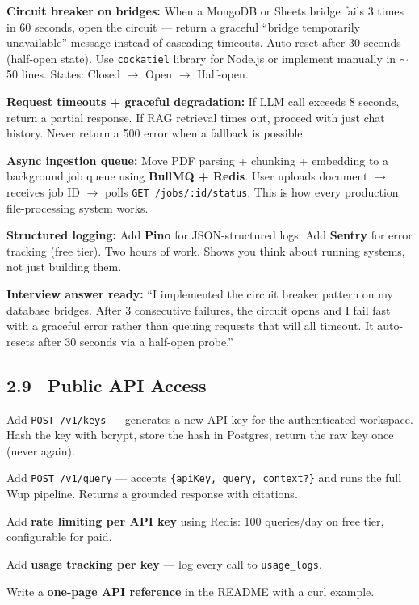 \documentclass[11pt, a4paper]{article}
\DeclareRobustCommand{\badge}[2]{%
  \tikz[baseline=(n.base)]{
    \node[inner sep=3pt, rounded corners=3pt,
          fill=#1!15, text=#1!70!black,
          font=\fontsize{8}{8}\selectfont\bfseries] (n) {#2};
  }%
}
\DeclareRobustCommand{\high}{\badge{warning}{HIGH}}
\begin{document}
\begin{checklist}
  \item \textbf{Circuit breaker on bridges:} When a MongoDB or Sheets bridge fails 3 times in 60 seconds, open the circuit — return a graceful ``bridge temporarily unavailable'' message instead of cascading timeouts. Auto-reset after 30 seconds (half-open state). Use \texttt{cockatiel} library for Node.js or implement manually in $\sim$50 lines. States: Closed $\rightarrow$ Open $\rightarrow$ Half-open.

  \item \textbf{Request timeouts + graceful degradation:} If LLM call exceeds 8 seconds, return a partial response. If RAG retrieval times out, proceed with just chat history. Never return a 500 error when a fallback is possible.

  \item \textbf{Async ingestion queue:} Move PDF parsing + chunking + embedding to a background job queue using \textbf{BullMQ + Redis}. User uploads document $\rightarrow$ receives job ID $\rightarrow$ polls \texttt{GET /jobs/:id/status}. This is how every production file-processing system works.

  \item \textbf{Structured logging:} Add \textbf{Pino} for JSON-structured logs. Add \textbf{Sentry} for error tracking (free tier). Two hours of work. Shows you think about running systems, not just building them.
\end{checklist}

\begin{successbox}
\textbf{Interview answer ready:} ``I implemented the circuit breaker pattern on my database bridges. After 3 consecutive failures, the circuit opens and I fail fast with a graceful error rather than queuing requests that will all timeout. It auto-resets after 30 seconds via a half-open probe.''
\end{successbox}

\subsection{2.9 \ Public API Access \hfill \high}

\begin{checklist}
  \item Add \texttt{POST /v1/keys} — generates a new API key for the authenticated workspace. Hash the key with bcrypt, store the hash in Postgres, return the raw key once (never again).
  \item Add \texttt{POST /v1/query} — accepts \texttt{\{apiKey, query, context?\}} and runs the full Wup pipeline. Returns a grounded response with citations.
  \item Add \textbf{rate limiting per API key} using Redis: 100 queries/day on free tier, configurable for paid.
  \item Add \textbf{usage tracking per key} — log every call to \texttt{usage\_logs}.
  \item Write a \textbf{one-page API reference} in the README with a curl example.
\end{checklist}
\end{document}
